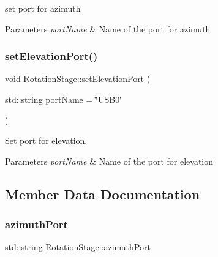 set port for azimuth 


\begin{DoxyParams}{Parameters}
{\em port\+Name} & Name of the port for azimuth \\
\hline
\end{DoxyParams}
\mbox{\label{class_rotation_stage_ab3e4f47bdb09f91c7c85a0fb8fc05e4b}} 
\subsubsection{\texorpdfstring{set\+Elevation\+Port()}{setElevationPort()}}
{\footnotesize\ttfamily void Rotation\+Stage\+::set\+Elevation\+Port (\begin{DoxyParamCaption}\item[{std\+::string}]{port\+Name = {\ttfamily \char`\"{}USB0\char`\"{}} }\end{DoxyParamCaption})}



Set port for elevation. 


\begin{DoxyParams}{Parameters}
{\em port\+Name} & Name of the port for elevation \\
\hline
\end{DoxyParams}


\subsection{Member Data Documentation}
\mbox{\label{class_rotation_stage_a50832a485e32836d10c4ebc2846fc93f}} 
\subsubsection{\texorpdfstring{azimuth\+Port}{azimuthPort}}
{\footnotesize\ttfamily std\+::string Rotation\+Stage\+::azimuth\+Port\hspace{0.3cm}{\ttfamily [private]}}

\mbox{\label{class_rotation_stage_a7e9ded06868713a22c1f630ce14c8f4e}} 
